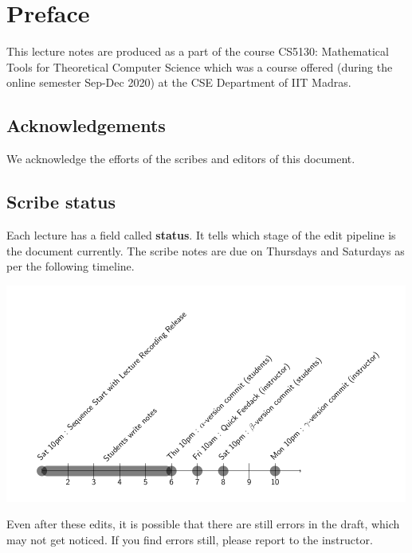 \chapter*{Preface}

This lecture notes are produced as a part of the course \textsf{CS5130: Mathematical Tools for Theoretical Computer Science} which was a course offered (during the online semester Sep-Dec 2020) at the CSE Department of IIT Madras.

\section*{Acknowledgements}

We acknowledge the efforts of the scribes and editors of this document.


\section*{Scribe status}
Each lecture has a field called {\bf status}. It tells which stage of the edit
pipeline is the document currently. The scribe notes are due on Thursdays and Saturdays as per the following timeline.

\begin{center}
\includegraphics[scale=1.5]{scribe-timeline.pdf}
\end{center}

Even after these edits, it is possible that there are still errors in the draft, which may not get noticed. If you find errors still, please report to the instructor.

